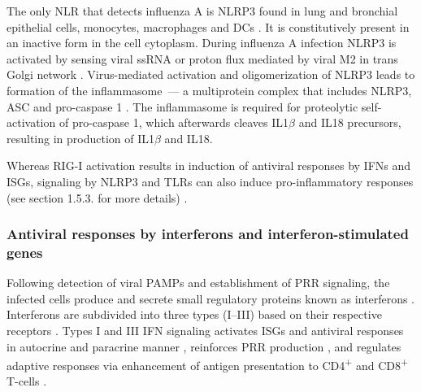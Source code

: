 		The only \gls{NLR} that detects influenza A is \gls{NLRP3} found in lung and bronchial epithelial cells, monocytes, macrophages and \gls{DC}s \parencite{Guarda2011, Kim2014}. It is constitutively present in an inactive form in the cell cytoplasm. During influenza A infection \gls{NLRP3} is activated by sensing viral \gls{ssRNA} or proton flux mediated by viral \gls{M2} in trans Golgi network \parencite{Thomas2009, Ichinohe2010, Allen2009}. Virus-mediated activation and oligomerization of \gls{NLRP3} leads to formation of the inflammasome~--- a multiprotein complex that includes \gls{NLRP3}, \gls{ASC} and pro-caspase 1 \parencite{Tschopp2010}. The inflammasome is required for proteolytic self-activation of pro-caspase 1, which afterwards cleaves IL1$\beta$ and IL18 precursors, resulting in production of IL1$\beta$ and IL18.
	
		Whereas \gls{RIG-I} activation results in induction of antiviral responses by \glspl{IFN} and \glspl{ISG}, signaling by \gls{NLRP3} and \glspl{TLR} can also induce pro-inflammatory responses (see section 1.5.3. for more details) \parencite{LeGoffic2007, Allen2009, Kawai2007}. 
		
		
		
		
		\subsubsection{Antiviral responses by interferons and interferon-stimulated genes}
		
		Following detection of viral \gls{PAMP}s and establishment of \gls{PRR} signaling, the infected cells produce and secrete small regulatory proteins known as interferons \parencite{Fensterl2009}. Interferons are subdivided into three types (I--III) based on their respective receptors  \parencite{Branca1981, Sheppard2003}. Types I and III \gls{IFN} signaling activates \gls{ISG}s and antiviral responses in autocrine and paracrine manner \parencite{Kotenko2003, Garcia-Sastre2006}, reinforces \gls{PRR} production \parencite{Pothlichet2013}, and regulates adaptive responses via enhancement of antigen presentation to CD4\textsuperscript{+} and CD8\textsuperscript{+} T-cells \parencite{Zietara2009}.
	
